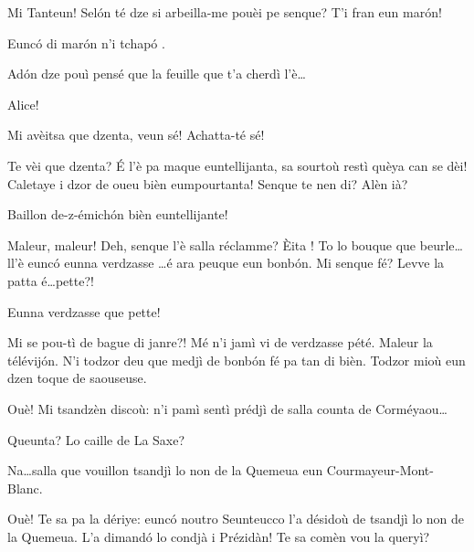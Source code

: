 \begin{drama}
\Sperancespeaks Mi Tanteun! Sel\'on té dze si arbeilla-me pouèi pe sen\-que? T'i fran eun mar\'on! 


\Tanteunspeaks{} Eunc\'o di mar\'on n'i tchap\'o .

\Mariespeaks Ad\'on dze pouì pensé que la feuille que t'a cherdì l'è\ldots

\Tanteunspeaks{} Alice!


\Tanteunspeaks Mi avèitsa que dzenta, veun sé! Achatta-té sé!


\Tanteunspeaks{} Te vèi que dzenta? \'E l'è pa maque euntellijanta, sa sourtoù restì quèya can se dèi! Caletaye i dzor de oueu bièn eumpourtanta! Senque te nen di? Alèn ià?





\Vioujspeaks Baillon de-z-émich\'on bièn euntellijante!

\Vioupspeaks Maleur, maleur! Deh, senque l'è salla réclamme? \`Eita ! To lo bouque que beurle\ldots ll'è eunc\'o eunna verdzasse \ldots é ara peuque eun bonb\'on. Mi senque fé? Levve la patta é\ldots pette?! 


\Vioujspeaks Eunna verdzasse que pette!

\Vioupspeaks Mi se pou-tì de bague di janre?! Mé n'i jamì vi de verdzasse pété. Maleur la télévij\'on. N'i todzor deu que medjì de bonb\'on fé pa tan di bièn. Todzor mioù eun dzen toque de saouseuse.

\Vioujspeaks Ouè! Mi tsandzèn discoù:  n'i pamì sentì prédjì de salla counta de Corméyaou\ldots

\Vioupspeaks Queunta? Lo caille de La Saxe?

\Vioujspeaks Na\ldots salla que vouillon tsandjì lo non de la Quemeua eun  Courmayeur-Mont-Blanc.

\Vioupspeaks Ouè! Te sa pa la dériye: eunc\'o noutro Seunteucco l'a désidoù de tsandjì lo non de la Quemeua. L'a dimand\'o lo condjà i Prézidàn! Te sa comèn vou la queryì?


\end{drama}
